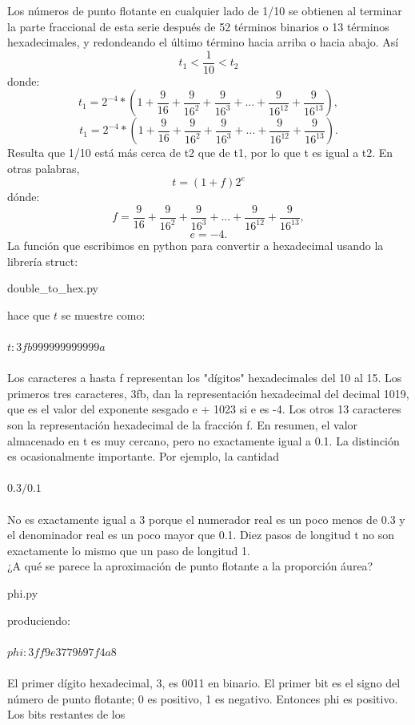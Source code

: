 \documentclass[12pt]{article}
\begin{document}
Los números de punto flotante en cualquier lado de 1/10 se obtienen al terminar la parte
fraccional de esta serie después de 52 términos binarios o 13 términos hexadecimales, y
redondeando el último término hacia arriba o hacia abajo. Así
$$t_1 < \frac{1}{10} < t_2$$
donde:
$$t_1 = 2^{-4}*(1+\frac{9}{16}+\frac{9}{16^2}+\frac{9}{16^3}+...+\frac{9}{16^{12}}+\frac{9}{16^{13}}),$$
$$t_1 = 2^{-4}*(1+\frac{9}{16}+\frac{9}{16^2}+\frac{9}{16^3}+...+\frac{9}{16^{12}}+\frac{9}{16^{13}}).$$
Resulta que 1/10 está más cerca de t2 que de t1, por lo que t es igual a t2. En otras palabras,
$$t = (1+f)2^e$$
d\'onde:
$$f = \frac{9}{16}+\frac{9}{16^2}+\frac{9}{16^3}+...+\frac{9}{16^{12}}+\frac{9}{16^{13}},$$
$$e = -4.$$
La funci\'on que escribimos en python para convertir a hexadecimal usando la librer\'ia struct:
\begin{center}

{double_to_hex.py}
\end{center}
hace que $t$ se muestre como:\\\\
$t: 3fb999999999999a$\\\\
Los caracteres a hasta f representan los "dígitos" hexadecimales del 10 al 15. Los primeros
tres caracteres, 3fb, dan la representación hexadecimal del decimal 1019, que es el valor del
exponente sesgado e + 1023 si e es -4. Los otros 13 caracteres son la representación
hexadecimal de la fracción f.
En resumen, el valor almacenado en t es muy cercano, pero no exactamente igual a 0.1. La
distinción es ocasionalmente importante. Por ejemplo, la cantidad\\\\
$0.3/0.1$\\\\
No es exactamente igual a 3 porque el numerador real es un poco menos de 0.3 y el
denominador real es un poco mayor que 0.1.
Diez pasos de longitud t no son exactamente lo mismo que un paso de longitud 1.\\
¿A qué se parece la aproximación de punto flotante a la proporción áurea?
\begin{center}

{phi.py}
\end{center}
produciendo:\\\\
$phi: 3ff9e3779b97f4a8$\\\\
El primer dígito hexadecimal, 3, es 0011 en binario. El primer bit es el signo del número de
punto flotante; 0 es positivo, 1 es negativo. Entonces phi es positivo. Los bits restantes de los
\end{document}
